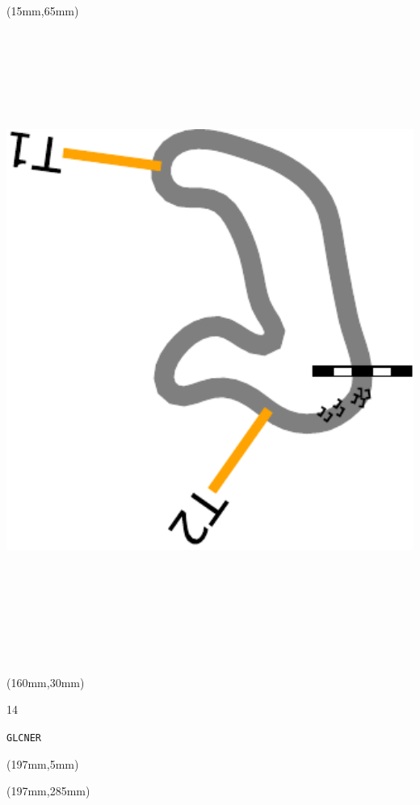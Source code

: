 \begin{textblock*}{185mm}(15mm,65mm)%
\centering
\mbox{\includegraphics[width=185mm,height=210mm,keepaspectratio]{PT/GLCNER.pdf}}
\end{textblock*}
\begin{textblock*}{40mm}(160mm,30mm)%
\Large
\par{} 
\par14 
\par\hfill\tiny\tt GLCNER\\
\end{textblock*}
\begin{textblock*}{20mm}(197mm,5mm)%
\fbox{\thepage}
\label{GLCNER}
\end{textblock*}
\begin{textblock*}{20mm}(197mm,285mm)%
\fbox{\thepage}
\end{textblock*}

